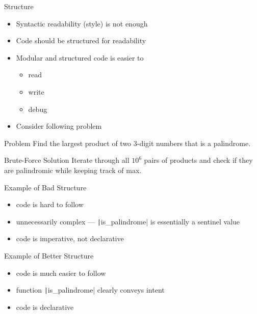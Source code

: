 \begin{frame}{Structure}
    \begin{itemize}[<+->]
        \item Syntactic readability (style) is not enough
        \item Code should be structured for readability
        \item \alert{Modular} and \alert{structured} code is easier to
              \begin{itemize}[<+->]
                  \item read
                  \item write
                  \item debug
              \end{itemize}
        \item Consider following problem
    \end{itemize}
    \pause
    \begin{block}{Problem}
        Find the largest product of two 3-digit numbers that is a palindrome.
    \end{block}
    \pause
    \begin{block}{Brute-Force Solution}
        Iterate through all $10^6$ pairs of products and check if they are palindromic while keeping track of max.
    \end{block}
\end{frame}
\begin{frame}{Example of Bad Structure}
    \pause
    \pause
    \begin{minipage}{0.3\textwidth}
        \vspace{-2.5in}\begin{itemize}[<+->]
            \item code is hard to follow
            \item unnecessarily complex --- \texttt|is_palindrome| is essentially a sentinel value
            \item code is imperative, not declarative
        \end{itemize}
    \end{minipage}
\end{frame}

\begin{frame}{Example of Better Structure}
    \pause
    \pause
    \begin{minipage}{0.3\textwidth}
        \vspace{-2in}\begin{itemize}[<+->]
            \item code is much easier to follow
            \item function \texttt|is_palindrome| clearly conveys intent
            \item code is declarative
        \end{itemize}
    \end{minipage}
\end{frame}

